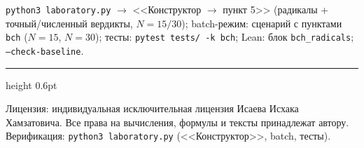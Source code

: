 \documentclass[11pt,a4paper]{article}
\theoremstyle{plain}
\theoremstyle{definition}
\theoremstyle{remark}
\begin{document}
\begin{verifybox}
\texttt{python3 laboratory.py} $\to$ <<Конструктор $\to$ пункт 5>>
(радикалы + точный/численный вердикты, $N=15/30$); batch-режим:
сценарий с пунктами \texttt{bch} ($N=15$, $N=30$);
тесты: \texttt{pytest tests/ -k bch}; Lean: блок
\texttt{bch\_radicals}; \texttt{--check-baseline}.
\end{verifybox}

\vfill
{\color{linkblue}\hrule height 0.6pt}
\vspace{0.5em}
{\small\color{gray}
Лицензия: индивидуальная исключительная лицензия Исаева Исхака Хамзатовича.
Все права на вычисления, формулы и тексты принадлежат автору.
Верификация: \texttt{python3 laboratory.py} (<<Конструктор>>, batch, тесты).
}
\end{document}
